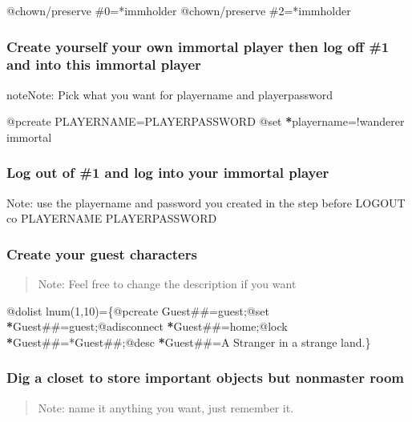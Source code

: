 \documentclass[letterpaper,10pt,english]{sphinxmanual}
\begin{document}
\sphinxAtStartPar
@chown/preserve \#0=*immholder
@chown/preserve \#2=*immholder


\subsubsection{Create yourself your own immortal player then log off \#1 and into this immortal player}
\label{\detokenize{gettingstarted:create-yourself-your-own-immortal-player-then-log-off-1-and-into-this-immortal-player}}
\begin{sphinxadmonition}{note}{Note:}
\sphinxAtStartPar
Pick what you want for playername and playerpassword
\end{sphinxadmonition}

\sphinxAtStartPar
@pcreate PLAYERNAME=PLAYERPASSWORD
@set {\color{red}\bfseries{}*}playername=!wanderer immortal


\subsubsection{Log out of \#1 and log into your immortal player}
\label{\detokenize{gettingstarted:log-out-of-1-and-log-into-your-immortal-player}}
\sphinxAtStartPar
Note: use the playername and password you created in the step before
LOGOUT
co PLAYERNAME PLAYERPASSWORD


\subsubsection{Create your guest characters}
\label{\detokenize{gettingstarted:create-your-guest-characters}}\begin{quote}

\sphinxAtStartPar
Note: Feel free to change the description if you want
\end{quote}

\sphinxAtStartPar
@dolist lnum(1,10)=\{@pcreate Guest\#\#=guest;@set {\color{red}\bfseries{}*}Guest\#\#=guest;@adisconnect {\color{red}\bfseries{}*}Guest\#\#=home;@lock {\color{red}\bfseries{}*}Guest\#\#=*Guest\#\#;@desc {\color{red}\bfseries{}*}Guest\#\#=A Stranger in a strange land.\}


\subsubsection{Dig a closet to store important objects but non\sphinxhyphen{}master room}
\label{\detokenize{gettingstarted:dig-a-closet-to-store-important-objects-but-non-master-room}}\begin{quote}

\sphinxAtStartPar
Note: name it anything you want, just remember it.
\end{quote}
\end{document}

